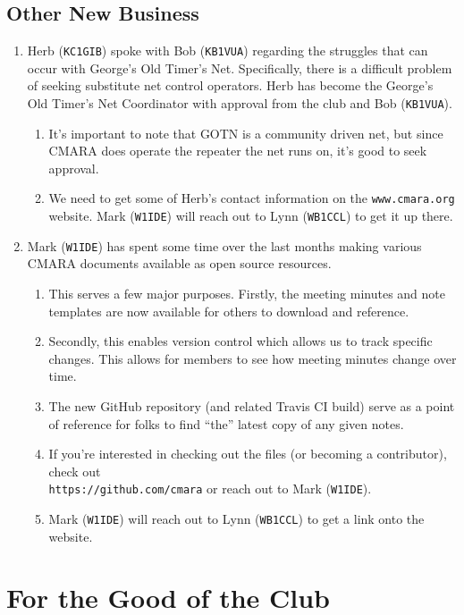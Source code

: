 \documentclass[10pt,letterpaper]{article}
\begin{document}
\subsection{Other New Business}
\begin{enumerate}
  \item Herb (\texttt{KC1GIB}) spoke with Bob (\texttt{KB1VUA}) regarding the struggles that can occur with George's Old Timer's Net. Specifically, there is a difficult problem of seeking substitute net control operators. Herb has become the George's Old Timer's Net Coordinator with approval from the club and Bob (\texttt{KB1VUA}).
  \begin{enumerate}
    \item It's important to note that GOTN is a community driven net, but since CMARA does operate the repeater the net runs on, it's good to seek approval.
    \item We need to get some of Herb's contact information on the \texttt{www.cmara.org} website. Mark (\texttt{W1IDE}) will reach out to Lynn (\texttt{WB1CCL}) to get it up there.
  \end{enumerate}
  \item Mark (\texttt{W1IDE}) has spent some time over the last months making various CMARA documents available as open source resources.
  \begin{enumerate}
    \item This serves a few major purposes. Firstly, the meeting minutes and note templates are now available for others to download and reference.
    \item Secondly, this enables version control which allows us to track specific changes. This allows for members to see how meeting minutes change over time.
    \item The new GitHub repository (and related Travis CI build) serve as a point of reference for folks to find ``the'' latest copy of any given notes.
    \item If you're interested in checking out the files (or becoming a contributor), check out\\ \texttt{https://github.com/cmara} or reach out to Mark (\texttt{W1IDE}).
    \item Mark (\texttt{W1IDE}) will reach out to Lynn (\texttt{WB1CCL}) to get a link onto the website.
  \end{enumerate}
\end{enumerate}

\section{For the Good of the Club}
\end{document}
